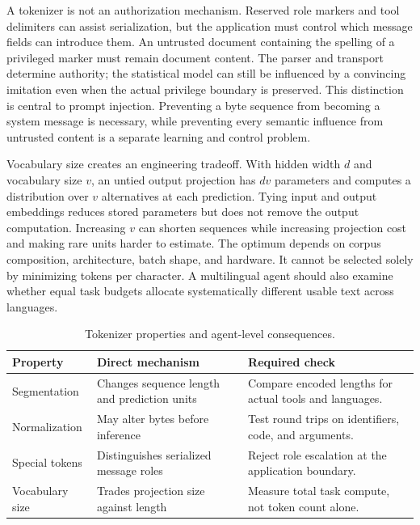 A tokenizer is not an authorization mechanism. Reserved role markers and tool delimiters can assist serialization, but the application must control which message fields can introduce them. An untrusted document containing the spelling of a privileged marker must remain document content. The parser and transport determine authority; the statistical model can still be influenced by a convincing imitation even when the actual privilege boundary is preserved. This distinction is central to prompt injection. Preventing a byte sequence from becoming a system message is necessary, while preventing every semantic influence from untrusted content is a separate learning and control problem.

Vocabulary size creates an engineering tradeoff. With hidden width $d$ and vocabulary size $v$, an untied output projection has $dv$ parameters and computes a distribution over $v$ alternatives at each prediction. Tying input and output embeddings reduces stored parameters but does not remove the output computation. Increasing $v$ can shorten sequences while increasing projection cost and making rare units harder to estimate. The optimum depends on corpus composition, architecture, batch shape, and hardware. It cannot be selected solely by minimizing tokens per character. A multilingual agent should also examine whether equal task budgets allocate systematically different usable text across languages.

{\small\setlength{\tabcolsep}{3pt}
\begin{table}[!htbp]
\centering
\caption{Tokenizer properties and agent-level consequences.}\label{tab:C03:tokenizers}
\begin{tabular}{L{25mm}L{39mm}L{42mm}}

\toprule Property & Direct mechanism & Required check\\\midrule
Segmentation & Changes sequence length and prediction units & Compare encoded lengths for actual tools and languages.\\
Normalization & May alter bytes before inference & Test round trips on identifiers, code, and arguments.\\
Special tokens & Distinguishes serialized message roles & Reject role escalation at the application boundary.\\
Vocabulary size & Trades projection size against length & Measure total task compute, not token count alone.\\
\bottomrule
\end{tabular}
\end{table}
}

